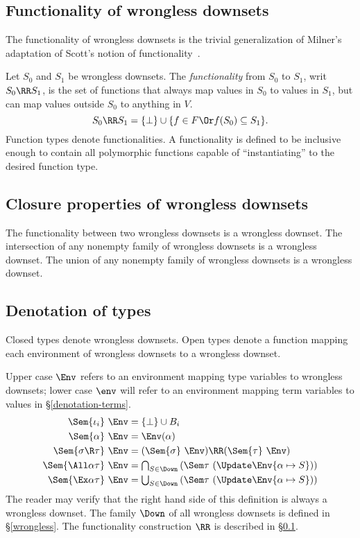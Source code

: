 \documentclass{amsart}
\theoremstyle{definition}
\begin{document}
\subsection{Functionality of wrongless downsets}
\label{functionality}
The functionality of wrongless down\-sets is the trivial
generalization of Milner's adaptation of Scott's notion of
functionality~\cite{Milner78}.

Let $S_0$ and $S_1$ be wrongless downsets. The
\emph{functionality} from $S_0$ to $S_1$, writ $S_0\RR S_1$, is
the set of functions that always map values in $S_0$ to values in
$S_1$, but can map values outside $S_0$ to anything in $V$.
\[
S_0 \RR S_1 =
\{\bot\}\cup\{f\in F \Or f(S_0) \subseteq S_1\}.
\]
Function types denote functionalities. A functionality is defined
to be inclusive enough to contain all polymorphic functions
capable of ``instantiating'' to the desired function type.

\subsection{Closure properties of wrongless downsets}
The functionality between two wrongless downsets is a wrongless
downset. The intersection of any nonempty family of wrongless
downsets is a wrongless downset. The union of any nonempty family
of wrongless downsets is a wrongless downset.

\subsection{Denotation of types}
\label{denotation-types}
Closed types denote wrongless downsets. Open types denote a
function mapping each environment of wrongless downsets to a
wrongless downset.

Upper case $\Env$ refers to an environment mapping type variables
to wrongless downsets; lower case $\env$ will refer to an environment
mapping term variables to values in \S\ref{denotation-terms}.
\begin{align*}
\Sem{\iota_i}~\Env &= \{\bot\}\cup B_i\\
\Sem{\alpha}~\Env &= \Env(\alpha)\\
\Sem{\sigma\R\tau}~\Env&=
  (\Sem{\sigma}~\Env)\RR(\Sem{\tau}~\Env)\\
\Sem{\All\alpha\tau}~\Env&=
  {\textstyle\bigcap_{S\in\Down}}
  \left(\Sem\tau~(\Update\Env{\alpha\mapsto S})\right)\\
\Sem{\Ex\alpha\tau}~\Env&=
  {\textstyle\bigcup_{S\in\Down}}
  \left(\Sem\tau~(\Update\Env{\alpha\mapsto S})\right)
\end{align*}
The reader may verify that the right hand side of this definition
is always a wrongless downset. The family $\Down$ of all
wrongless downsets is defined in \S\ref{wrongless}. The
functionality construction $\RR$ is described in
\S\ref{functionality}.
\end{document}

